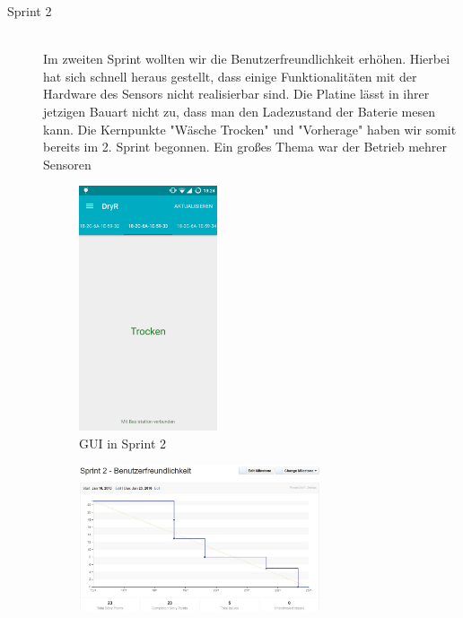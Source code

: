\begin{description}
	\newpage
	\item [Sprint 2] \hfill \\
		Im zweiten Sprint wollten wir die Benutzerfreundlichkeit erhöhen.
		Hierbei hat sich schnell heraus gestellt, dass einige Funktionalitäten mit der Hardware des Sensors nicht realisierbar sind. Die Platine lässt in ihrer jetzigen Bauart nicht zu, dass man den Ladezustand der Baterie mesen kann. Die Kernpunkte "Wäsche Trocken" und "Vorherage" haben wir somit bereits im 2. Sprint begonnen. Ein großes Thema war der Betrieb mehrer Sensoren \\
	
		\begin{figure}[H]
			\centering
			\includegraphics[width=0.4\textwidth]{laundry_status_multiple_sensors.png}
			\caption{GUI in Sprint 2}
		\end{figure}
	
		\begin{figure}[H]
			\centering
			\includegraphics[width=0.7\textwidth]{burndown_sprint2.jpg}
		\end{figure}
	

\end{description}
